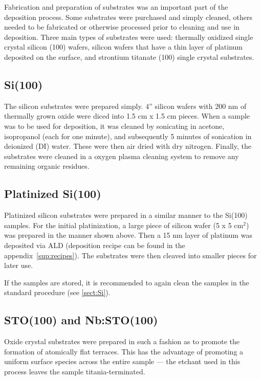 Fabrication and preparation of substrates was an important part of the deposition process. Some substrates were purchased and simply cleaned, others needed to be fabricated or otherwise processed prior to cleaning and use in deposition. Three main types of substrates were used: thermally oxidized single crystal silicon (100) wafers, silicon wafers that have a thin layer of platinum deposited on the surface, and strontium titanate (100) single crystal substrates. 

\subsection{Si(100)} \label{sect:Si}

The silicon substrates were prepared simply. 4'' silicon wafers with 200 nm of thermally grown oxide were diced into 1.5 cm x 1.5 cm pieces. When a sample was to be used for deposition, it was cleaned by sonicating in acetone, isopropanol (each for one minute), and subsequently 5 minutes of sonication in deionized (DI) water. These were then air dried with dry nitrogen. Finally, the substrates were cleaned in a oxygen plasma cleaning system to remove any remaining organic residues. 



\subsection{Platinized Si(100)}

Platinized silicon substrates were prepared in a similar manner to the Si(100) samples. For the initial platinization, a large piece of silicon wafer (5 x 5 cm$^{2}$) was prepared in the manner shown above. Then a 15 nm layer of platinum was deposited via ALD (deposition recipe can be found in the appendix~\vref{sup:recipes}). The substrates were then cleaved into smaller pieces for later use. 

If the samples are stored, it is recommended to again clean the samples in the standard procedure (see \vref{sect:Si}).


\subsection{STO(100) and Nb:STO(100)}

Oxide crystal substrates were prepared in such a fashion as to promote the formation of atomically flat terraces. This has the advantage of promoting a uniform surface species across the entire sample --- the etchant used in this process leaves the sample titania-terminated. 

